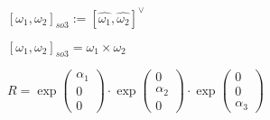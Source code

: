 \documentclass{article}
\begin{document}
$ [\omega_1, \omega_2]_{so3} := [\widehat{\omega_1}, \widehat{\omega_2}]^\vee $
\pagebreak

$ [\omega_1, \omega_2]_{so3} = \omega_1 \times \omega_2 $
\pagebreak

$ R=\exp\left(\begin{array}{c}\alpha_1\\ 0\\ 0\end{array}\right) \cdot \exp\left(\begin{array}{c}0\\ \alpha_2\\ 0\end{array}\right) \cdot \exp\left(\begin{array}{c}0\\ 0\\ \alpha_3\end{array}\right)$
\pagebreak
\end{document}
